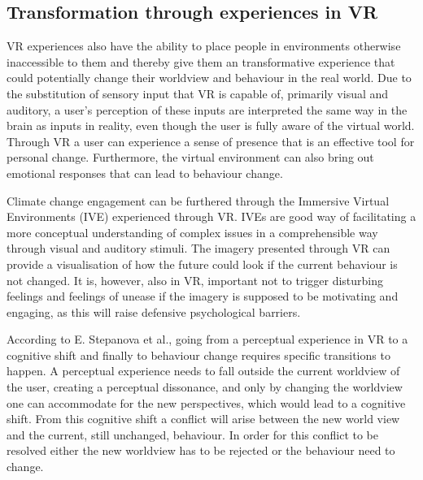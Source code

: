     \subsection{Transformation through experiences in VR}
    VR experiences also have the ability to place people in environments otherwise inaccessible to them\cite{vrCapabilitiesSlater, emotiveImagery} and thereby give them an transformative experience that could potentially change their worldview and behaviour in the real world\cite{transformativeVR, riva2016transforming}. Due to the substitution of sensory input that VR is capable of, primarily visual and auditory, a user's perception of these inputs are interpreted the same way in the brain as inputs in reality, even though the user is fully aware of the virtual world\cite{vrCapabilitiesSlater}. Through VR a user can experience a sense of presence that is an effective tool for personal change\cite{riva2016transforming}. Furthermore, the virtual environment can also bring out emotional responses that can lead to behaviour change\cite{transformativeVR, ahn2011embodied}.
    
    Climate change engagement can be furthered through the Immersive Virtual Environments (IVE) experienced through VR\cite{vrEngagementClimateChange}. IVEs are good way of facilitating a more conceptual understanding of complex issues in a comprehensible way through visual and auditory stimuli. The imagery presented through VR can provide a visualisation of how the future could look if the current behaviour is not changed\cite{emotiveImagery}. It is, however, also in VR, important not to trigger disturbing feelings and feelings of unease if the imagery is supposed to be motivating and engaging, as this will raise defensive psychological barriers\cite{emotiveImagery}.
    
    According to E. Stepanova et al., going from a perceptual experience in VR to a cognitive shift and finally to behaviour change requires specific transitions to happen\cite{transformativeVR}. A perceptual experience needs to fall outside the current worldview of the user, creating a perceptual dissonance, and only by changing the worldview one can accommodate for the new perspectives, which would lead to a cognitive shift. From this cognitive shift a conflict will arise between the new world view and the current, still unchanged, behaviour. In order for this conflict to be resolved either the new worldview has to be rejected or the behaviour need to change\cite{transformativeVR}.
    
